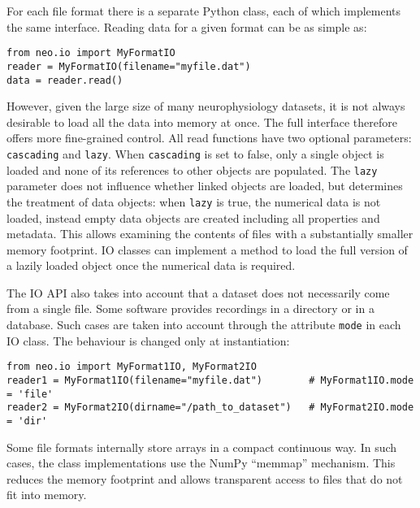 \documentclass{frontiers}
\begin{document}
For each file format there is a separate Python class, each of which implements the same interface. Reading data for a given format can be as simple as:

\begin{lstlisting}[style=display]
from neo.io import MyFormatIO
reader = MyFormatIO(filename="myfile.dat")
data = reader.read()
\end{lstlisting}

However, given the large size of many neurophysiology datasets, it is not always desirable to load all the data into memory at once. The full interface therefore offers more fine-grained control.
All read functions have two optional parameters: \lstinline`cascading` and \lstinline`lazy`.
When \lstinline`cascading` is set to false, only a single object is loaded and none of its references to other objects are populated.
The \lstinline`lazy` parameter does not influence whether linked objects are loaded, but determines the treatment of data objects: when \lstinline`lazy` is true, the numerical data is not loaded, instead empty data objects are created including all properties and metadata. This allows examining the contents of files with a substantially smaller memory footprint. IO classes can implement a method to load the full version of a lazily loaded object once the numerical data is required.

The IO API also takes into account that a dataset does not necessarily come from a single file. Some software provides recordings in a directory or in a database. Such cases are taken into account through the attribute \lstinline`mode` in each IO class. The behaviour is changed only at instantiation:

\begin{lstlisting}[style=display]
from neo.io import MyFormat1IO, MyFormat2IO
reader1 = MyFormat1IO(filename="myfile.dat")        # MyFormat1IO.mode = 'file'
reader2 = MyFormat2IO(dirname="/path_to_dataset")   # MyFormat2IO.mode = 'dir'
\end{lstlisting}

Some file formats internally store arrays in a compact continuous way. In such cases, the class implementations use the NumPy ``memmap'' mechanism. This reduces the memory footprint and allows transparent access to files that do not fit into memory.
\end{document}

